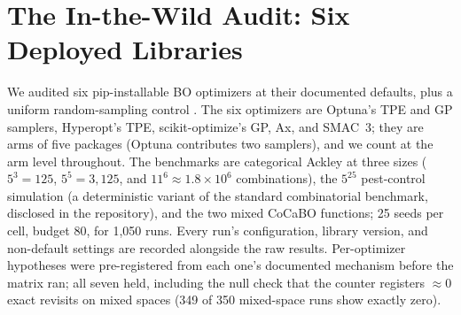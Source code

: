\documentclass[%
 aip,
 amsmath,amssymb,
 floatfix,
 reprint,%
]{revtex4-1}
\begin{document}
\section{The In-the-Wild Audit: Six Deployed Libraries}
\label{sec:wild}

We audited six pip-installable BO optimizers at their documented defaults,
plus a uniform random-sampling control \cite{bergstra2012random}. The six
optimizers are Optuna's TPE and GP samplers, Hyperopt's TPE,
scikit-optimize's GP, Ax, and SMAC~3; they are arms of five packages
(Optuna contributes two samplers), and we count at the arm level
throughout. The benchmarks are categorical Ackley at three sizes ($5^3{=}125$,
$5^5{=}3{,}125$, and $11^6{\approx}1.8{\times}10^6$ combinations), the
$5^{25}$ pest-control simulation (a deterministic variant of the standard
combinatorial benchmark, disclosed in the repository), and the two mixed
CoCaBO functions; 25 seeds per cell, budget 80, for 1{,}050 runs. Every
run's configuration, library version, and non-default settings are
recorded alongside the raw results. Per-optimizer hypotheses were
pre-registered from each one's documented mechanism before the matrix
ran; all seven held, including the null check that the counter registers
${\approx}0$ exact revisits on mixed spaces (349 of 350 mixed-space runs
show exactly zero).
\end{document}
